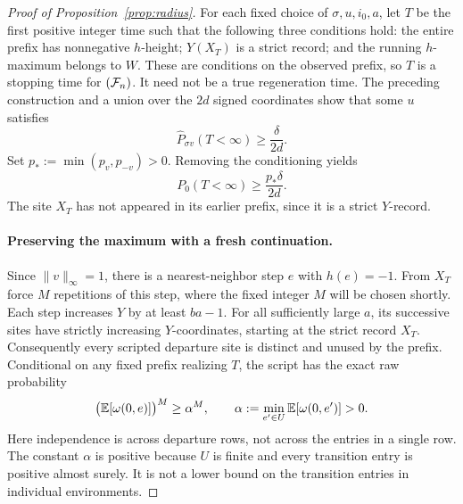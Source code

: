 \begin{proof}[Proof of Proposition~\ref{prop:radius}]
For each fixed choice of \(\sigma,u,i_0,a\), let \(T\) be the first
positive integer time such that the following three conditions hold:
the entire prefix has nonnegative \(h\)-height; \(Y(X_T)\) is a
strict record; and the running \(h\)-maximum belongs to \(W\).
These are conditions on the observed prefix, so \(T\) is a stopping
time for \((\mathcal F_n)\).  It need not be a true regeneration time.
The preceding construction and a union over the \(2d\) signed
coordinates show that some \(u\) satisfies
\[
 \widehat P_{\sigma v}(T<\infty)\ge\frac{\delta}{2d}.
\]
Set \(p_*:=\min(p_v,p_{-v})>0\).  Removing the conditioning yields
\begin{equation}\label{eq:radius-launch-probability}
 P_0(T<\infty)\ge\frac{p_*\delta}{2d}.
\end{equation}
The site \(X_T\) has not appeared in its earlier prefix, since it is
a strict \(Y\)-record.

\paragraph{Preserving the maximum with a fresh continuation.}
Since \(\|v\|_\infty=1\), there is a nearest-neighbor step \(e\)
with \(h(e)=-1\).  From \(X_T\) force \(M\) repetitions of this
step, where the fixed integer \(M\) will be chosen shortly.  Each
step increases \(Y\) by at least \(ba-1\).  For all sufficiently
large \(a\), its successive sites have strictly increasing
\(Y\)-coordinates, starting at the strict record \(X_T\).
Consequently every scripted departure site is distinct and unused by
the prefix.  Conditional on any fixed prefix realizing \(T\), the
script has the exact raw probability
\[
 \bigl(\mathbb E[\omega(0,e)]\bigr)^M\ge\alpha^M,
 \qquad \alpha:=\min_{e'\in U}\mathbb E[\omega(0,e')]>0.
\]
Here independence is across departure rows, not across the entries in
a single row.  The constant \(\alpha\) is positive because \(U\) is
finite and every transition entry is positive almost surely.  It is
not a lower bound on the transition entries in individual environments.


\end{proof}
